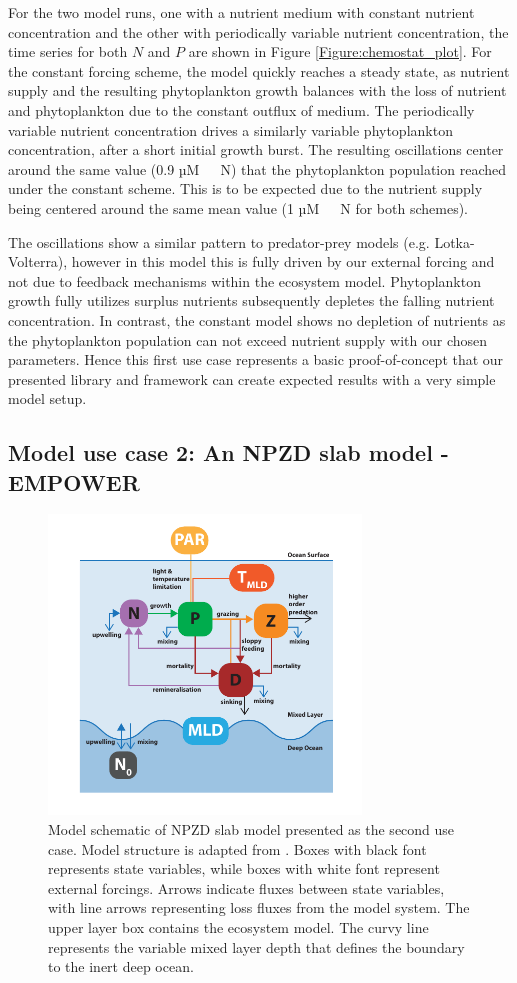 \documentclass[journal abbreviation, manuscript]{copernicus}
\begin{document}
For the two model runs, one with a nutrient medium with constant nutrient concentration and the other with periodically variable nutrient concentration, the time series for both $N$ and $P$ are shown in Figure \ref{Figure:chemostat_plot}.
For the constant forcing scheme, the model quickly reaches a steady state, as nutrient supply and the resulting phytoplankton growth balances with the loss of nutrient and phytoplankton due to the constant outflux of medium.
The periodically variable nutrient concentration drives a similarly variable phytoplankton concentration, after a short initial growth burst. The resulting oscillations center around the same value (0.9 \unit{µM \ N}) that the phytoplankton population reached under the constant scheme. This is to be expected due to the nutrient supply being centered around the same mean value (1 \unit{µM \ N} for both schemes).

The oscillations show a similar pattern to predator-prey models (e.g. Lotka-Volterra), however in this model this is fully driven by our external forcing and not due to feedback mechanisms within the ecosystem model. Phytoplankton growth fully utilizes surplus nutrients subsequently depletes the falling nutrient concentration. In contrast, the constant model shows no depletion of nutrients as the phytoplankton population can not exceed nutrient supply with our chosen parameters. Hence this first use case represents a basic proof-of-concept that our presented library and framework can create expected results with a very simple model setup.

\subsection{Model use case 2: An NPZD slab model - EMPOWER}
\begin{figure}[t]
\includegraphics[width=8.3cm]{Figures/firstdraft_schematics/02_schematics_EMPOWER.pdf}
\caption{Model schematic of NPZD slab model presented as the second use case. Model structure is adapted
from \citet{Anderson2015c}. Boxes with black font represents state variables, while boxes with white font represent external forcings. Arrows indicate fluxes between state variables, with line arrows representing loss fluxes from the model system. The upper layer box contains the ecosystem model. The curvy line represents the variable mixed layer depth that defines the boundary to the inert deep ocean.}
\label{Figure:ModelSchematics_2}
\end{figure}
\end{document}
